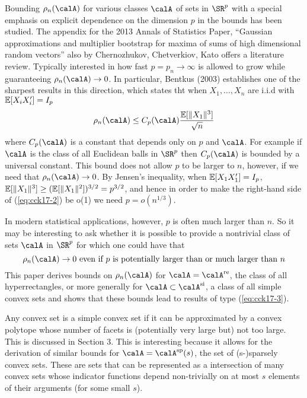 Bounding $\rho_n(\calA)$ for various classes $\calA$ of sets in $\SR^p$ with a special emphasis on explicit dependence on the dimension $p$ in the bounds has been studied. The appendix for the 2013 Annals of Statistics Paper, ``Gaussian approximations and multiplier bootstrap for maxima of sums of high dimensional random vectors'' also by Chernozhukov, Chetverkiov, Kato offers a literature review. Typically interested in how fast $p = p_n \rightarrow \infty$ is allowed to grow while guaranteeing $\rho_n(\calA)\to 0$. In particular, Bentkus (2003) establishes one of the sharpest results in this direction, which states tht when $X_1, \dots, X_n$ are i.i.d with $\mathbb{E}[X_i X_i'] = I_p$
\begin{equation}
	\label{eq:cck17-2}
	\rho_n(\calA)\leq C_p(\calA)\frac{\E[\|X_1\|^3]}{\sqrt{n}}
\end{equation}
where $C_p(\calA)$ is a constant that depends only on $p$ and $\calA$. For example if $\calA$ is the class of all Euclidean balls in $\SR^p$ then $C_p(\calA)$ is bounded by a universal constant. This bound does not allow $p$ to be larger to $n$, however, if we need that $\rho_n(\calA)\rightarrow 0$. By Jensen's inequality, when $\mathbb{E}[X_1 X_1']= I_p$, $\mathbb{E}[\|X_1\|^3] \geq (\mathbb{E}[\|X_1\|^2])^{3/2} = p^{3/2}$, and hence in order to make the right-hand side of (\ref{eq:cck17-2}) be o(1) we need $p = o(n^{1/3})$. 

In modern statistical applications, however, $p$ is often much larger than $n$. So it may be interesting to ask whether it is possible to provide a nontrivial class of sets $\calA$ in $\SR^p$ for which one could have that 
\begin{equation}
	\label{eq:cck17-3}
	\rho_n(\calA)\to 0 \text{ even if $p$ is potentially larger than or much larger than }n
\end{equation}
This paper derives bounds on $\rho_n(\calA)$ for $\calA = \calA^{\text{re}}$, the class of all hyperrectangles, or more generally for $\calA\subset \calA^{\text{si}}$, a class of all simple convex sets and shows that these bounds lead to results of type (\ref{eq:cck17-3}). 

Any convex set is a simple convex set if it can be approximated by a convex polytope whose number of facets is (potentially very large but) not too large. This is discussed in Section 3. This is interesting because it allows for the derivation of similar bounds for $\calA = \calA^{\text{sp}}(s)$, the set of (s-)sparsely convex sets. These are sets that can be represented as a intersection of many convex sets whose indicator functions depend non-trivially on at most $s$ elements of their arguments (for some small $s$).

